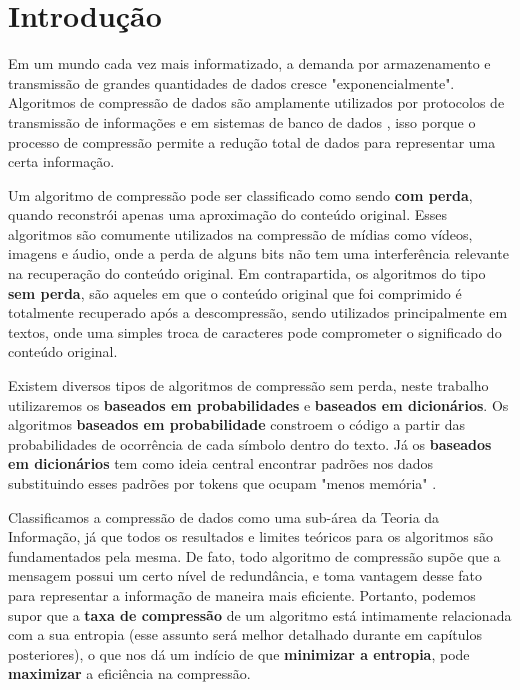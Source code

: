 \chapter*[Introdução]{Introdução}

Em um mundo cada vez mais informatizado, a demanda por armazenamento e transmissão de grandes quantidades de dados cresce "exponencialmente".  
Algoritmos de compressão de dados são amplamente utilizados por protocolos de transmissão de informações \cite{MDN} e em sistemas de banco de dados \cite{MicDocs}, isso porque o processo de compressão permite a redução total de dados para representar uma certa informação.

Um algoritmo de compressão pode ser classificado como sendo \textbf{com perda}, quando reconstrói apenas uma aproximação do conteúdo original. 
Esses algoritmos são comumente utilizados na compressão de mídias como vídeos, imagens e áudio, onde a perda de alguns bits não tem uma interferência relevante na recuperação do conteúdo original. 
Em contrapartida, os algoritmos do tipo \textbf{sem perda}, são aqueles em que o conteúdo original que foi comprimido é totalmente recuperado após a descompressão, sendo utilizados principalmente em textos, onde uma simples troca de caracteres pode comprometer o significado do conteúdo original. 

Existem diversos tipos de algoritmos de compressão sem perda, neste trabalho utilizaremos os \textbf{baseados em probabilidades} e \textbf{baseados em dicionários}. 
Os algoritmos \textbf{baseados em probabilidade} constroem o código a partir das probabilidades de ocorrência de cada símbolo dentro do texto. 
Já os \textbf{baseados em dicionários} tem como ideia central encontrar padrões nos dados substituindo esses padrões por tokens que ocupam "menos memória" \cite{Camb}.

Classificamos a compressão de dados como uma sub-área da Teoria da Informação, já que todos os resultados e limites teóricos para os algoritmos são fundamentados pela mesma. 
De fato, todo algoritmo de compressão supõe que a mensagem possui um certo nível de redundância, e toma vantagem desse fato para representar a informação de maneira mais eficiente. 
Portanto, podemos supor que a \textbf{taxa de compressão} de um algoritmo está intimamente relacionada com a sua entropia (esse assunto será melhor detalhado durante em capítulos posteriores), o que nos dá um indício de que \textbf{minimizar a entropia}, pode \textbf{maximizar} a eficiência na compressão.

